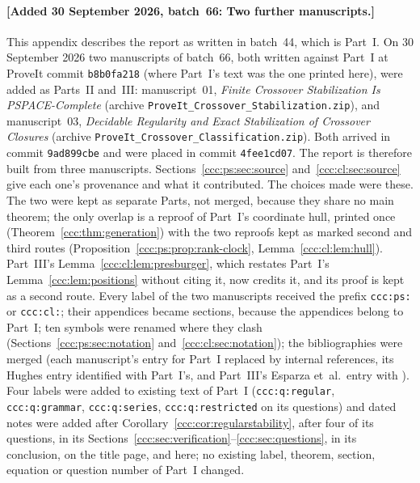 \documentclass[11pt,letterpaper]{article}
\theoremstyle{definition}
\theoremstyle{remark}
\newcommand{\wadd}[1]{\textup{[}Added 30 September 2026, batch~66: #1\textup{]}}
\begin{document}
\paragraph{\wadd{Two further manuscripts.}} This appendix describes the
report as written in batch~44, which is Part~I. On 30 September 2026 two
manuscripts of batch~66, both written against Part~I at ProveIt commit
\texttt{b8b0fa218} (where Part~I's text was the one printed here), were added
as Parts~II and~III: manuscript~01, \emph{Finite Crossover Stabilization Is
PSPACE-Complete} (archive \texttt{ProveIt\_Crossover\_Stabilization.zip}),
and manuscript~03, \emph{Decidable Regularity and Exact Stabilization of
Crossover Closures} (archive \texttt{ProveIt\_Crossover\_Classification.zip}).
Both arrived in commit \texttt{9ad899cbe} and were placed in commit
\texttt{4fee1cd07}. The report is therefore built from three manuscripts.
Sections~\ref{ccc:ps:sec:source} and~\ref{ccc:cl:sec:source} give each one's
provenance and what it contributed. The choices made were these. The two
were kept as separate Parts, not merged, because they share no main theorem;
the only overlap is a reproof of Part~I's coordinate hull, printed once
(Theorem~\ref{ccc:thm:generation}) with the two reproofs kept as marked second
and third routes (Proposition~\ref{ccc:ps:prop:rank-clock},
Lemma~\ref{ccc:cl:lem:hull}). Part~III's Lemma~\ref{ccc:cl:lem:presburger},
which restates Part~I's Lemma~\ref{ccc:lem:positions} without citing it, now
credits it, and its proof is kept as a second route. Every label of the two
manuscripts received the prefix \texttt{ccc:ps:} or \texttt{ccc:cl:}; their
appendices became sections, because the appendices belong to Part~I; ten
symbols were renamed where they clash (Sections~\ref{ccc:ps:sec:notation}
and~\ref{ccc:cl:sec:notation}); the bibliographies were merged (each
manuscript's entry for Part~I replaced by internal references, its
Hughes entry identified with Part~I's, and Part~III's Esparza et~al.\ entry
with \cite{EGKL}). Four labels were added to existing text of Part~I
(\texttt{ccc:q:regular}, \texttt{ccc:q:grammar}, \texttt{ccc:q:series},
\texttt{ccc:q:restricted} on its questions) and dated notes were added after
Corollary~\ref{ccc:cor:regularstability}, after four of its questions, in its
Sections~\ref{ccc:sec:verification}--\ref{ccc:sec:questions}, in its
conclusion, on the title page, and here; no existing label, theorem, section,
equation or question number of Part~I changed.
\end{document}
